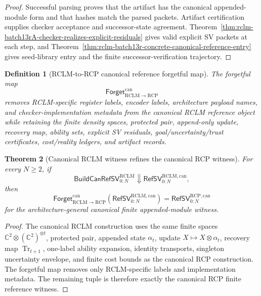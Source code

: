 \documentclass[11pt,a4paper]{article}
\newtheorem{theorem}{Theorem}[section]
\newtheorem{definition}[theorem]{Definition}
\newcommand{\RCP}{\mathrm{RCP}}
\newcommand{\RCLM}{\mathrm{RCLM}}
\begin{document}
\begin{proof}
Successful parsing proves that the artifact has the canonical appended-module form and that hashes match the parsed packets.  Artifact certification supplies checker acceptance and successor-state agreement.  Theorem~\ref{thm:rclm-batch13rA-checker-realizes-explicit-residuals} gives valid explicit SV packets at each step, and Theorem~\ref{thm:rclm-batch13r-concrete-canonical-reference-entry} gives seed-library entry and the finite successor-verification trajectory.
\end{proof}

\begin{definition}[RCLM-to-RCP canonical reference forgetful map]
\label{def:rclm-batch13rA-forgetful-map-to-rcp}
The forgetful map
\[
\mathsf{Forget}_{\RCLM\to\RCP}^{\mathrm{can}}
\]
removes RCLM-specific register labels, encoder labels, architecture payload names, and checker-implementation metadata from the canonical RCLM reference object while retaining the finite density spaces, protected pair, append-only update, recovery map, ability sets, explicit SV residuals, goal/uncertainty/trust certificates, cost/reality ledgers, and artifact records.
\end{definition}

\begin{theorem}[Canonical RCLM witness refines the canonical RCP witness]
\label{thm:rclm-batch13rA-refines-rcp-canonical-witness}
For every \(N\ge2\), if
\[
\mathsf{BuildCanRefSV}_{0:N}^{\RCLM}
\Downarrow
\mathsf{RefSV}_{0:N}^{\RCLM,\mathrm{can}},
\]
then
\[
\mathsf{Forget}_{\RCLM\to\RCP}^{\mathrm{can}}(\mathsf{RefSV}_{0:N}^{\RCLM,\mathrm{can}})
=
\mathsf{RefSV}_{0:N}^{\RCP,\mathrm{can}}
\]
for the architecture-general canonical finite appended-module witness.
\end{theorem}

\begin{proof}
The canonical RCLM construction uses the same finite spaces \(\mathbb C^2\otimes(\mathbb C^2)^{\otimes t}\), protected pair, appended state \(\alpha_t\), update \(X\mapsto X\otimes\alpha_t\), recovery map \(\operatorname{Tr}_{t+1}\), one-label ability expansion, identity transports, singleton uncertainty envelope, and finite cost bounds as the canonical RCP construction.  The forgetful map removes only RCLM-specific labels and implementation metadata.  The remaining tuple is therefore exactly the canonical RCP finite reference witness.
\end{proof}
\end{document}
